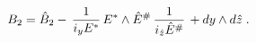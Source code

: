 \begin{equation}
\label{rTdB2} 
B_2 = \hat{B}_2 - \, 
{1\over i_{y}{E}^{ {*}}} \, 
E^{ {*}} \wedge \hat{E}^{ {\# }} \,
{1\over i_{\hat{z}}\hat{E}^{ {\#}}}\, 
+ dy  \wedge d\hat{z} \; .
\end{equation}

